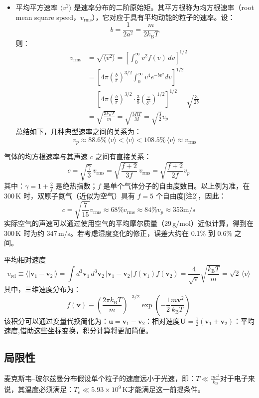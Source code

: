 \begin{itemize}
\item 平均平方速率 $\langle v^2 \rangle$ 是速率分布的二阶原始矩。其平方根称为均方根速率（root mean square speed，$v_{\text{rms}}$），它对应于具有平均动能的粒子的速率。设：
$$
b = \frac{1}{2a^2} = \frac{m}{2k_{\text{B}}T}~
$$
则：
$$
\begin{aligned}
v_{\text{rms}} &= \sqrt{\langle v^2 \rangle} = \left[\int_0^\infty v^2 f(v)\, dv\right]^{1/2} \\
&= \left[ 4\pi \left( \frac{b}{\pi} \right)^{3/2} \int_0^\infty v^4 e^{-bv^2} dv \right]^{1/2} \\
&= \left[ 4\pi \left( \frac{b}{\pi} \right)^{3/2} \cdot \frac{3}{8} \left( \frac{\pi}{b^5} \right)^{1/2} \right]^{1/2}= \sqrt{\frac{3}{2b}} \\
&= \sqrt{\frac{3k_{\text{B}}T}{m}} = \sqrt{\frac{3RT}{M}} = \sqrt{\frac{3}{2}}v_p
\end{aligned}~
$$
总结如下，几种典型速率之间的关系为：
$$
v_p \approx 88.6\%\, \langle v \rangle < \langle v \rangle < 108.5\%\, \langle v \rangle \approx v_{\text{rms}}~
$$
\end{itemize}
气体的均方根速率与其声速 $c$ 之间有直接关系：
$$
c = \sqrt{\frac{\gamma}{3}}\, v_{\mathrm{rms}} = \sqrt{\frac{f + 2}{3f}}\, v_{\mathrm{rms}} = \sqrt{\frac{f + 2}{2f}} v_p~
$$
其中：$\gamma = 1 + \frac{2}{f}$ 是绝热指数；$f$ 是单个气体分子的自由度数目。以上例为准，在 300 K 时，双原子氮气（近似为空气）具有 $f = 5$ 个自由度[注2]，因此：
$$
c = \sqrt{\frac{7}{15}} v_{\mathrm{rms}} \approx 68\% v_{\mathrm{rms}} \approx 84\% v_p \approx 353 \mathrm{m/s}~
$$
实际空气的声速可以通过使用空气的平均摩尔质量（29 g/mol）近似计算，得到在 300 K 时为约 347 m/s。若考虑湿度变化的修正，误差大约在 0.1\% 到 0.6\% 之间。

平均相对速度
$$
v_{\text{rel}} \equiv \langle |\mathbf{v}_1 - \mathbf{v}_2| \rangle = \int d^3\mathbf{v}_1\, d^3\mathbf{v}_2\, |\mathbf{v}_1 - \mathbf{v}_2|\, f(\mathbf{v}_1) f(\mathbf{v}_2) = \frac{4}{\sqrt{\pi}} \sqrt{\frac{k_{\text{B}} T}{m}} = \sqrt{2}\, \langle v \rangle~
$$
其中，三维速度分布为：
$$
f(\mathbf{v}) \equiv \left( \frac{2\pi k_{\text{B}} T}{m} \right)^{-3/2} \exp\left( -\frac{1}{2} \frac{m \mathbf{v}^2}{k_{\text{B}} T} \right)~
$$
该积分可以通过变量代换简化为：$\mathbf{u} = \mathbf{v}_1 - \mathbf{v}_2$：相对速度$\mathbf{U} = \tfrac{1}{2}(\mathbf{v}_1 + \mathbf{v}_2)$：平均速度,借助这些坐标变换，积分计算将更加简便。
\subsection{局限性}
麦克斯韦–玻尔兹曼分布假设单个粒子的速度远小于光速，即：$T \ll \frac{mc^2}{k_{\text{B}}}$对于电子来说，其温度必须满足：$T_e \ll 5.93 \times 10^9\, \mathrm{K}$才能满足这一前提条件。
